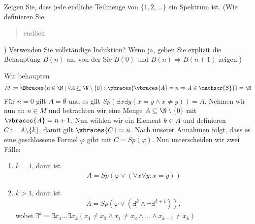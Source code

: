
\begin{exercise}[71]

\phantom{}
	Zeigen Sie, dass jede endliche Teilmenge von  $\{1,2, \dots \}$ ein Spektrum ist. (Wie definieren Sie \blockquote{endlich}?) Verwenden Sie vollständige Induktion? Wenn ja, geben Sie explizit die Behauptung $B(n)$ an, von der Sie $B(0)$ und $B(n) \Rightarrow B(n + 1)$ zeigen.)

\end{exercise}


\begin{solution}

\phantom{}
	Wir behaupten
	\begin{align*}
	M := \Bbraces{n \in \N \mid \forall A \subseteq \N \setminus \{0\}: \pbraces{\vbraces{A} = n \Rightarrow  A \in \mathscr{S}}} = \N
	\end{align*}
	Für $n = 0$ gilt $A = \emptyset$ und es gilt $Sp(\exists x \exists y(x = y \land x \neq y)) = A$. \newline
	Nehmen wir nun an $n \in M$ und betrachten wir eine Menge $A \subseteq \N \setminus \{0\}$ mit $\vbraces{A} = n + 1$. Nun wählen wir ein Element $k \in A$ und definieren $C := A \setminus \{k\}$, damit gilt $\vbraces{C} = n$. Nach unserer Annahmen folgt, dass es eine geschlossene Formel $\varphi$ gibt mit $C = Sp(\varphi)$. Nun unterscheiden wir zwei Fälle:
	\begin{enumerate}[label = Fall \arabic*:]
		\item $k = 1$, dann ist
			\begin{align*}
			A = Sp(\varphi \lor (\forall x \forall y: x = y))
			\end{align*}
		\item $k > 1$, dann ist
			\begin{align*}
			A = Sp(\varphi \lor (\exists^k \land \neg \exists^{k + 1})),
			\end{align*}
			wobei $\exists^k = \exists x_1 \dots \exists x_k (x_1 \neq x_2 \land x_1 \neq x_2 \land \dots \land x_{k - 1} \neq x_k)$
	\end{enumerate}
\end{solution}

